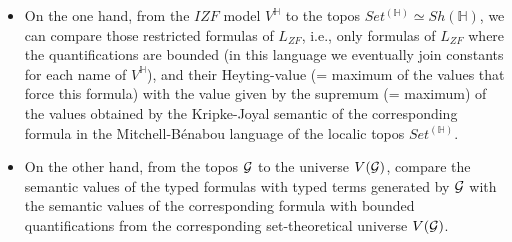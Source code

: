 \documentclass[10pt,longbibliography]{article}
\newcommand{\He}{\mathbb{H}}
\begin{document}
\begin{itemize}




    


\item On the one hand, from the  $IZF$  model $V^\He$ to the topos $Set^{(\He)} \simeq Sh(\He)$, we can compare those restricted formulas of $L_{ZF}$, i.e., only formulas of $L_{ZF}$ where the quantifications are bounded (in this language we eventually join constants for each name of $V^\He$), and their Heyting-value (= maximum of the values that force this formula) with the value given by the supremum (= maximum) of the values obtained by the Kripke-Joyal semantic of the corresponding formula in the Mitchell-Bénabou language of the localic topos $Set^{(\He)}$.

\item On the other hand, from the topos $\cal G$ to the universe $V(\cal G)$, compare the semantic values of the typed formulas with typed terms generated by $\cal G$ with the semantic values of the corresponding formula with bounded quantifications from the corresponding set-theoretical universe $V(\cal G)$.


\end{itemize}

\end{document}
